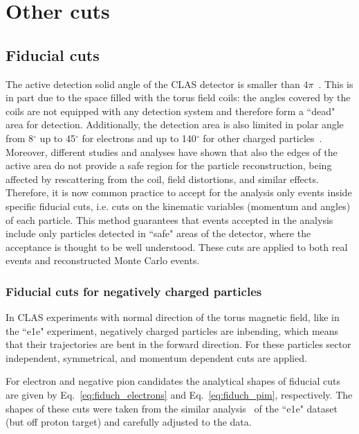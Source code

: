 \section{Other cuts}
\label{Sect:other_cuts}


\subsection{Fiducial cuts}
\label{Sect:fiduc} 

The active detection solid angle of the CLAS detector is smaller than $4\pi$~\cite{Mecking:2003zu}. This is in part due to the space filled with the torus field coils: the angles covered by the coils are not equipped with any detection system and therefore form a ``dead" area for detection. Additionally, the detection area is also limited in polar angle from 8$^{\circ}\mathrm{}$ up to 45$^{\circ}\mathrm{}$ for electrons and up to 140$^{\circ}\mathrm{}$ for other charged particles~\cite{Mecking:2003zu}. Moreover, different studies and analyses have shown that also the edges of the active area do not provide a safe region for the particle reconstruction, being affected by rescattering from the coil, field distortions, and similar effects. Therefore, it is now common practice to accept for the analysis only events inside specific fiducial cuts, i.e. cuts on the kinematic variables (momentum and angles) of each particle. This method guarantees that events accepted in the analysis include only particles detected in ``safe" areas of the detector, where the acceptance is thought to be well understood. These cuts are applied to both real events and reconstructed Monte Carlo events. 




\subsubsection{Fiducial cuts for negatively charged particles}
\label{Sect:fiduc_neg}

In CLAS experiments with normal direction of the torus magnetic field, like in the ``e1e" experiment, negatively charged particles are inbending, which means that their trajectories are bent in the forward direction. For these particles sector independent, symmetrical, and momentum dependent cuts are applied. 

For electron and negative pion candidates the analytical shapes of fiducial cuts are given by Eq.~\eqref{eq:fiduch_electrons} and Eq.~\eqref{eq:fiduch_pim}, respectively. The shapes of these cuts were taken from the similar analysis~\cite{Fed_an_note:2017} of the ``e1e" dataset (but off proton target) and carefully adjusted to the data.

